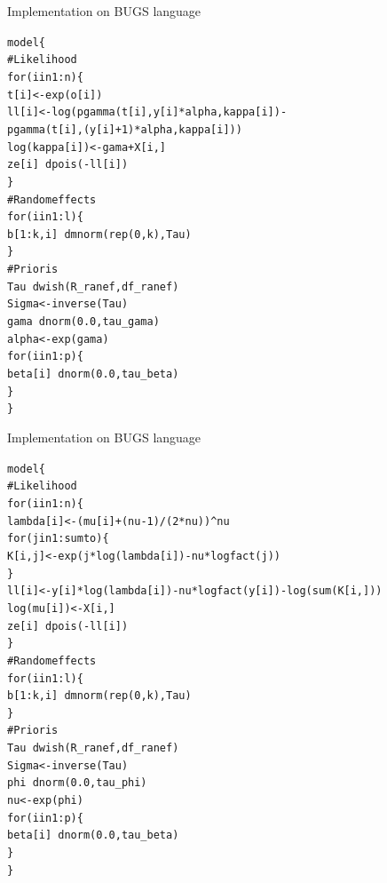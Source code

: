 \documentclass[11pt]{beamer}\usepackage[]{graphicx}\usepackage[]{color}
\makeatletter
\newcommand{\hlcom}[1]{\textcolor[rgb]{0.439,0.502,0.565}{#1}}%
\newcommand{\hlkwd}[1]{\textcolor[rgb]{0.545,0.941,0.902}{#1}}%
\newenvironment{kframe}{%
 \def\at@end@of@kframe{}%
 \ifinner\ifhmode%
  \def\at@end@of@kframe{\end{minipage}}%
  \begin{minipage}{\columnwidth}%
 \fi\fi%
 \def\FrameCommand##1{\hskip\@totalleftmargin \hskip-\fboxsep
 \colorbox{shadecolor}{##1}\hskip-\fboxsep
     \hskip-\linewidth \hskip-\@totalleftmargin \hskip\columnwidth}%
 \MakeFramed {\advance\hsize-\width
   \@totalleftmargin\z@ \linewidth\hsize
   \@setminipage}}%
 {\par\unskip\endMakeFramed%
 \at@end@of@kframe}
\newenvironment{knitrout}{}{} %
\makeatother
\begin{document}
\begin{frame}[fragile]{Implementation on BUGS language}
\vspace{-0.4cm}
\begin{knitrout}\scriptsize
{}\color{fgcolor}\begin{kframe}
\begin{alltt}
model \{
\hlcom{  # Likelihood}
  \hlkwd{for} (i in 1:n) \{
    t[i] <- \hlkwd{exp}(o[i])
    ll[i] <- \hlkwd{log}(\hlkwd{pgamma}(t[i], y[i] * alpha, kappa[i]) -
                 \hlkwd{pgamma}(t[i], (y[i] + 1) * alpha, kappa[i]))
    \hlkwd{log}(kappa[i]) <- gama + X[i, ] %
    ze[i] ~ \hlkwd{dpois}(-ll[i])
  \}
\hlcom{  # Random effects}
  \hlkwd{for} (i in 1:l) \{
    b[1:k, i] ~ \hlkwd{dmnorm}(\hlkwd{rep}(0, k), Tau)
  \}
\hlcom{  # Prioris}
  Tau ~ \hlkwd{dwish}(R_ranef, df_ranef)
  Sigma <- \hlkwd{inverse}(Tau)
  gama ~ \hlkwd{dnorm}(0.0, tau_gama)
  alpha <- \hlkwd{exp}(gama)
  \hlkwd{for} (i in 1:p) \{
    beta[i] ~ \hlkwd{dnorm}(0.0, tau_beta)
  \}
\}
\end{alltt}
\end{kframe}
\end{knitrout}
\end{frame}

\begin{frame}[fragile]{Implementation on BUGS language}
\vspace{-0.4cm}
\begin{knitrout}\scriptsize
{}\color{fgcolor}\begin{kframe}
\begin{alltt}
model \{
\hlcom{  # Likelihood}
  \hlkwd{for} (i in 1:n) \{
     lambda[i] <- (mu[i] + (nu - 1)/(2 * nu))^nu
     \hlkwd{for} (j in 1:sumto) \{
      K[i, j] <- \hlkwd{exp}(j * \hlkwd{log}(lambda[i]) - nu * \hlkwd{logfact}(j))
    \}
    ll[i] <- y[i] * \hlkwd{log}(lambda[i]) - nu * \hlkwd{logfact}(y[i]) - \hlkwd{log}(\hlkwd{sum}(K[i, ]))
    \hlkwd{log}(mu[i]) <- X[i, ] %
    ze[i] ~ \hlkwd{dpois}(-ll[i])
  \}
\hlcom{  # Random effects}
  \hlkwd{for} (i in 1:l) \{
    b[1:k, i] ~ \hlkwd{dmnorm}(\hlkwd{rep}(0, k), Tau)
  \}
\hlcom{  # Prioris}
  Tau ~ \hlkwd{dwish}(R_ranef, df_ranef)
  Sigma <- \hlkwd{inverse}(Tau)
  phi ~ \hlkwd{dnorm}(0.0, tau_phi)
  nu <- \hlkwd{exp}(phi)
  \hlkwd{for} (i in 1:p) \{
    beta[i] ~ \hlkwd{dnorm}(0.0, tau_beta)
  \}
\}
\end{alltt}
\end{kframe}
\end{knitrout}
\end{frame}
\end{document}
